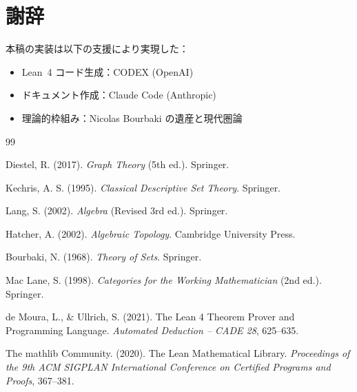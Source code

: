 \documentclass[a4paper,12pt]{ltjsarticle}
\theoremstyle{definition}
\begin{document}
\section*{謝辞}

本稿の実装は以下の支援により実現した：
\begin{itemize}
  \item Lean~4 コード生成：CODEX (OpenAI)
  \item ドキュメント作成：Claude Code (Anthropic)
  \item 理論的枠組み：Nicolas Bourbaki の遺産と現代圏論
\end{itemize}

\begin{thebibliography}{99}

Diestel, R. (2017). \textit{Graph Theory} (5th ed.). Springer.

Kechris, A. S. (1995). \textit{Classical Descriptive Set Theory}. Springer.

Lang, S. (2002). \textit{Algebra} (Revised 3rd ed.). Springer.

Hatcher, A. (2002). \textit{Algebraic Topology}. Cambridge University Press.

Bourbaki, N. (1968). \textit{Theory of Sets}. Springer.

Mac Lane, S. (1998). \textit{Categories for the Working Mathematician} (2nd ed.). Springer.

de Moura, L., \& Ullrich, S. (2021). The Lean 4 Theorem Prover and Programming Language.
\textit{Automated Deduction -- CADE 28}, 625--635.

The mathlib Community. (2020). The Lean Mathematical Library.
\textit{Proceedings of the 9th ACM SIGPLAN International Conference on Certified Programs and Proofs}, 367--381.

\end{thebibliography}
\end{document}
